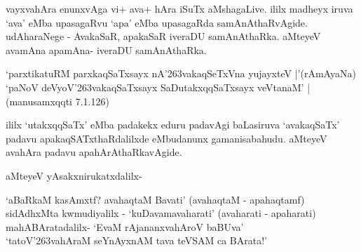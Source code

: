 vayxvahAra enunxvAga vi+ ava+ hAra iSuTx aMshagaLive. ililx madheyx iruva `ava' eMba upasagaRvu `apa' eMba upasagaRda samAnAthaRvAgide. udAharaNege - AvakaSaR, apakaSaR iveraDU samA\-nAthaRka. aMteyeV avamAna apamAna- iveraDU samAnAthaRka.

\begin{shloka}
`parxtikatuRM parxkaqSaTxsayx nA\char'263vakaqSeTxVna yujayxteV |'\hfill{(rAmAyaNa)}\\\label{223}
`paNoV deVyoV\char'263vakaqSaTxsayx SaDutakxqqSaTxsayx veVtanaM' | \hfill{(manusamxqqti 7.1.126)}\label{223}
\end{shloka}

ililx `utakxqqSaTx' eMba padakekx eduru padavAgi baLasiruva `avakaqSaTx' padavu apakaqSATxthaRdalilxde eMbu\-danunx gamanisabahudu. aMteyeV avahAra padavu apahArAthaRkavAgide.

aMteyeV yAsakxnirukatxdalilx-

\begin{shloka}
`aBaRkaM kasAmxtf? avahaqtaM Bavati' (avahaqtaM - apahaqtamf)\\\label{224}
sidAdhxMta kwmudiyalilx - `kuDavamavaharati' (avaharati - apaharati)\\
mahABAratadalilx- `EvaM rAjananxvahAroV baBUva'\\\label{224}
`tatoV\char'263vahAraM seYnAyxnAM tava teVSAM ca BArata!'
\end{shloka}


